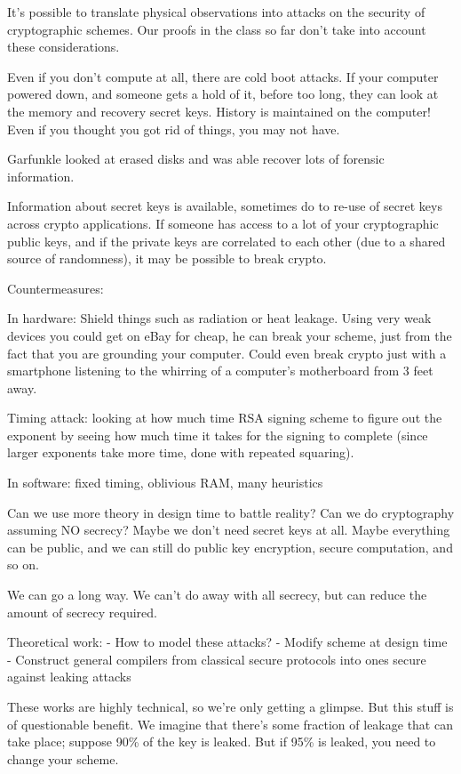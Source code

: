 \documentclass[10pt]{article}
\begin{document}
It's possible to translate physical observations into attacks on the security of cryptographic schemes. Our proofs in the class so far don't take into account these considerations.

Even if you don't compute at all, there are cold boot attacks. If your computer powered down, and someone gets a hold of it, before too long, they can look at the memory and recovery secret keys. History is maintained on the computer! Even if you thought you got rid of things, you may not have.

Garfunkle looked at erased disks and was able recover lots of forensic information.

Information about secret keys is available, sometimes do to re-use of secret keys across crypto applications. If someone has access to a lot of your cryptographic public keys, and if the private keys are correlated to each other (due to a shared source of randomness), it may be possible to break crypto.

Countermeasures:

In hardware: Shield things such as radiation or heat leakage. Using very weak devices you could get on eBay for cheap, he can break your scheme, just from the fact that you are grounding your computer. Could even break crypto just with a smartphone listening to the whirring of a computer's motherboard from 3 feet away.

Timing attack: looking at how much time RSA signing scheme to figure out the exponent by seeing how much time it takes for the signing to complete (since larger exponents take more time, done with repeated squaring).

In software: fixed timing, oblivious RAM, many heuristics

Can we use more theory in design time to battle reality? Can we do cryptography assuming NO secrecy? Maybe we don't need secret keys at all. Maybe everything can be public, and we can still do public key encryption, secure computation, and so on.

We can go a long way. We can't do away with all secrecy, but can reduce the amount of secrecy required.

Theoretical work:
- How to model these attacks?
- Modify scheme at design time
- Construct general compilers from classical secure protocols into ones secure against leaking attacks

These works are highly technical, so we're only getting a glimpse. But this stuff is of questionable benefit. We imagine that there's some fraction of leakage that can take place; suppose 90\% of the key is leaked. But if 95\% is leaked, you need to change your scheme.
\end{document}
